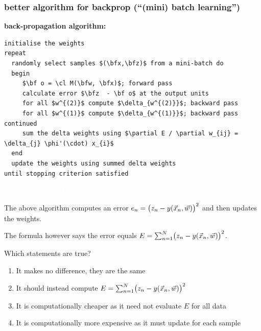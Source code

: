 \documentclass[USenglish,pdftex,compress,10pt,svgnamesi,handout]{beamer}
\newcommand{\bfw}{\Vec{w}}
\newcommand{\bfx}{\Vec{x}}
\newcommand{\bfz}{\Vec{z}}
\def\bf#1{\Vec{#1}}
\def\cl#1{{\cal #1}}
\begin{document}
\begin{frame}[fragile]
\frametitle{better algorithm for backprop (``(mini) batch learning'')}

\begin{beamerboxesrounded}[upper=def,lower=block body,width=1.03\textwidth,shadow]{\textbf{back-propagation algorithm:}}
\begin{lstlisting}[mathescape]
initialise the weights
repeat
  randomly select samples $(\bfx,\bfz)$ from a mini-batch do
  begin
     $\bf o = \cl M(\bfw, \bfx)$; forward pass
     calculate error $\bfz  - \bf o$ at the output units
     for all $w^{(2)}$ compute $\delta_{w^{(2)}}$; backward pass
     for all $w^{(1)}$ compute $\delta_{w^{(1)}}$; backward pass continued
     sum the delta weights using $\partial E / \partial w_{ij} = \delta_{j} \phi'(\cdot) x_{i}$
  end
  update the weights using summed delta weights
until stopping criterion satisfied
\end{lstlisting}
\end{beamerboxesrounded}
\textcolor{white}{What is wrong with this learning method?}

\end{frame}



\begin{poll}
The above algorithm computes an error $e_n = \bigl(z_n - y(\Vec x_n, \Vec w)\bigr)^2$ and then updates the weights.

The formula however says the error equals $E = \sum_{n=1}^N \bigl(z_n - y(\Vec x_n, \Vec w)\bigr)^2$.

Which statements are true?

\begin{enumerate} [A]
\item 
  It makes no difference, they are the same
\item
 It should instead compute $E = \sum_{n=1}^N \bigl(z_n - y(\Vec x_n, \Vec w)\bigr)^2$
\item
 It is computationally cheaper as it need not evaluate $E$ for all data
\item
 It is computationally more expensive as it must update for each sample
\end{enumerate}
\end{poll}

\end{document}
